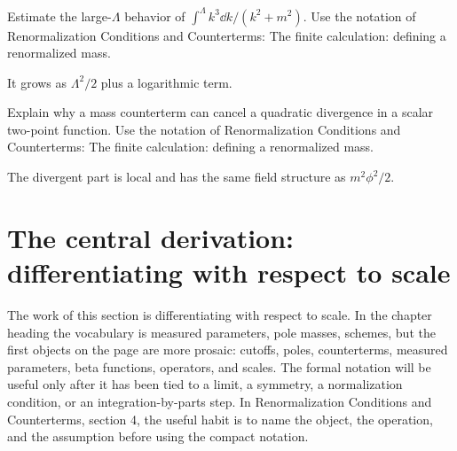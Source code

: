 \begin{exercise}
Estimate the large-\(\Lambda\) behavior of \(\int^\Lambda k^3\dd k/(k^2+m^2)\).  Use the notation of Renormalization Conditions and Counterterms: The finite calculation: defining a renormalized mass.
\begin{answer}
It grows as \(\Lambda^2/2\) plus a logarithmic term.
\end{answer}
\end{exercise}

\begin{exercise}
Explain why a mass counterterm can cancel a quadratic divergence in a scalar two-point function.  Use the notation of Renormalization Conditions and Counterterms: The finite calculation: defining a renormalized mass.
\begin{answer}
The divergent part is local and has the same field structure as \(m^2\phi^2/2\).
\end{answer}
\end{exercise}



\section{The central derivation: differentiating with respect to scale}













The work of this section is differentiating with respect to scale.  In the chapter heading the vocabulary is measured parameters, pole masses, schemes, but the first objects on the page are more prosaic: cutoffs, poles, counterterms, measured parameters, beta functions, operators, and scales.  The formal notation will be useful only after it has been tied to a limit, a symmetry, a normalization condition, or an integration-by-parts step.  In Renormalization Conditions and Counterterms, section 4, the useful habit is to name the object, the operation, and the assumption before using the compact notation.

